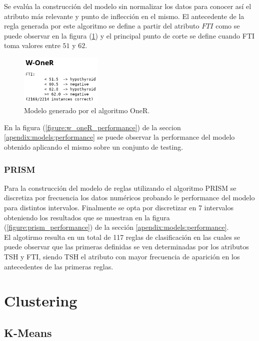 \documentclass[osajnl,twocolumn,showpacs,superscriptaddress,10pt,floatfix]{revtex4-1} %
\begin{document}
Se evalúa la construcción del modelo sin normalizar los datos para conocer así el atributo más relevante y punto de inflección en el mismo. El antecedente de la regla generada por este algoritmo se define a partir del atributo $FTI$ como se puede observar en la figura (\ref{figure:w_oneR}) y el principal punto de corte se define cuando FTI toma valores entre $51$ y $62$. \\

\begin{figure}[H]
    \centering
    \includegraphics[width=0.35\textwidth]{models/w_oneR}
    \caption{Modelo generado por el algoritmo OneR.}
    \label{figure:w_oneR}
\end{figure}

En la figura (\ref{figure:w_oneR_performance}) de la seccion \ref{apendix:models:performance} se puede observar la performance del modelo obtenido aplicando el mismo sobre un conjunto de testing. \\

\subsubsection{PRISM}

Para la construcción del modelo de reglas utilizando el algoritmo PRISM se discretiza por frecuencia los datos numéricos probando le performance del modelo para distintos intervalos. Finalmente se opta por discretizar en 7 intervalos obteniendo los resultados que se muestran en la figura (\ref{figure:prism_performance}) de la sección \ref{apendix:models:performance}. \\

El algotirmo resulta en un total de 117 reglas de clasificación en las cuales se puede observar que las primeras definidas se ven determinadas por los atributos TSH y FTI, siendo TSH el atributo con mayor frecuencia de aparición en los antecedentes de las primeras reglas.

\section{Clustering}

\subsection{K-Means}
\end{document}
